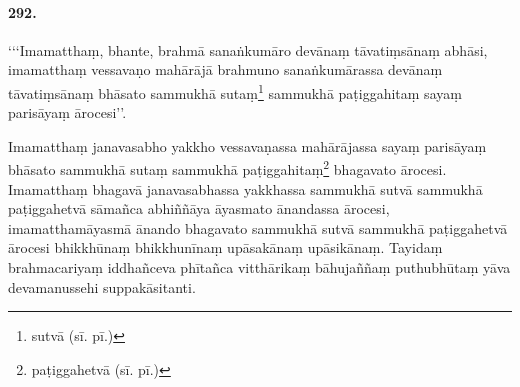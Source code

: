 \paragraph{292.} ‘‘‘Imamatthaṃ, bhante, brahmā sanaṅkumāro devānaṃ tāvatiṃsānaṃ abhāsi, imamatthaṃ vessavaṇo mahārājā brahmuno sanaṅkumārassa devānaṃ tāvatiṃsānaṃ bhāsato sammukhā sutaṃ\footnote{sutvā (sī. pī.)} sammukhā paṭiggahitaṃ sayaṃ parisāyaṃ ārocesi’’.

Imamatthaṃ janavasabho yakkho vessavaṇassa mahārājassa sayaṃ parisāyaṃ bhāsato sammukhā sutaṃ sammukhā paṭiggahitaṃ\footnote{paṭiggahetvā (sī. pī.)} bhagavato ārocesi. Imamatthaṃ bhagavā janavasabhassa yakkhassa sammukhā sutvā sammukhā paṭiggahetvā sāmañca abhiññāya āyasmato ānandassa ārocesi, imamatthamāyasmā ānando bhagavato sammukhā sutvā sammukhā paṭiggahetvā ārocesi bhikkhūnaṃ bhikkhunīnaṃ upāsakānaṃ upāsikānaṃ. Tayidaṃ brahmacariyaṃ iddhañceva phītañca vitthārikaṃ bāhujaññaṃ puthubhūtaṃ yāva devamanussehi suppakāsitanti.

